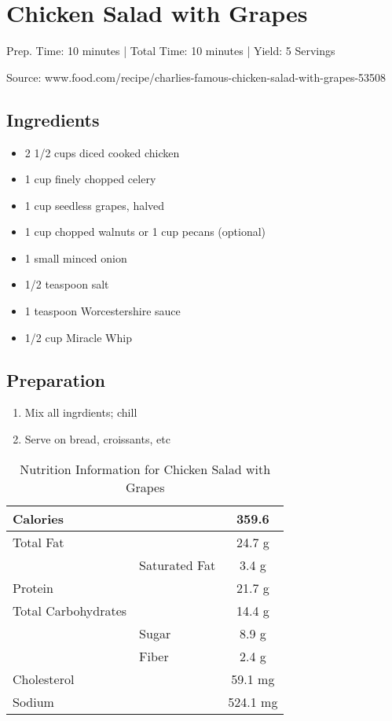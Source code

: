 \section{Chicken Salad with Grapes}

\begin{center}
\noindent Prep. Time: 10 minutes |
Total Time: 10 minutes | 
Yield: 5 Servings

Source: www.food.com/recipe/charlies-famous-chicken-salad-with-grapes-53508
\end{center}

\subsection{Ingredients}
\begin{multicols}{2}
\begin{itemize}
    \item 2 1/2 cups diced cooked chicken
    \item 1 cup finely chopped celery
    \item 1 cup seedless grapes, halved
    \item 1 cup chopped walnuts or 1 cup pecans (optional)
    \item 1 small minced onion
    \item 1/2 teaspoon salt
    \item 1 teaspoon Worcestershire sauce
    \item 1/2 cup Miracle Whip
\end{itemize}
\end{multicols}

\subsection{Preparation}
\begin{enumerate}
    \item Mix all ingrdients; chill
    \item Serve on bread, croissants, etc
\end{enumerate}

\begin{table}%
    \centering
    \begin{tabular}{|ll|c|}
        \hline
        Calories & & 359.6\\
        \hline
        Total Fat & & 24.7 g \\
        & Saturated Fat & 3.4 g\\
        \hline
        Protein & & 21.7 g\\
        \hline
        Total Carbohydrates & & 14.4 g\\
        & Sugar & 8.9 g\\
        & Fiber & 2.4 g\\
        \hline
        Cholesterol & & 59.1 mg\\
        \hline
        Sodium & & 524.1 mg\\
        \hline
    \end{tabular}
    \caption{Nutrition Information for Chicken Salad with Grapes}
\end{table}

